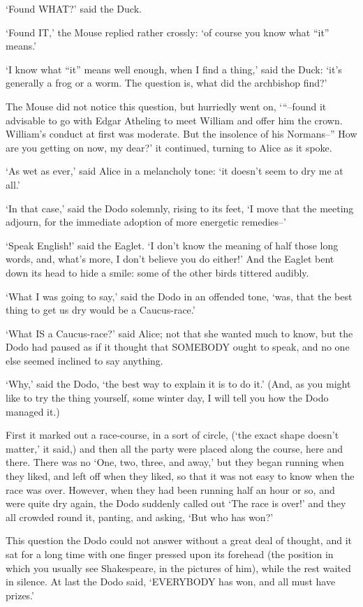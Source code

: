 \documentclass[12pt]{book}
\begin{document}
  `Found WHAT?' said the Duck.

  `Found IT,' the Mouse replied rather crossly:  `of course you
know what ``it'' means.'

  `I know what ``it'' means well enough, when I find a thing,' said
the Duck:  `it's generally a frog or a worm.  The question is,
what did the archbishop find?'

  The Mouse did not notice this question, but hurriedly went on,
`{}``--found it advisable to go with Edgar Atheling to meet William
and offer him the crown.  William's conduct at first was
moderate.  But the insolence of his Normans--''  How are you
getting on now, my dear?' it continued, turning to Alice as it
spoke.

  `As wet as ever,' said Alice in a melancholy tone:  `it doesn't
seem to dry me at all.'

  `In that case,' said the Dodo solemnly, rising to its feet, `I
move that the meeting adjourn, for the immediate adoption of more
energetic remedies--'

  `Speak English!' said the Eaglet.  `I don't know the meaning of
half those long words, and, what's more, I don't believe you do
either!'  And the Eaglet bent down its head to hide a smile:
some of the other birds tittered audibly.

  `What I was going to say,' said the Dodo in an offended tone,
`was, that the best thing to get us dry would be a Caucus-race.'

  `What IS a Caucus-race?' said Alice; not that she wanted much
to know, but the Dodo had paused as if it thought that SOMEBODY
ought to speak, and no one else seemed inclined to say anything.

  `Why,' said the Dodo, `the best way to explain it is to do it.'
(And, as you might like to try the thing yourself, some winter
day, I will tell you how the Dodo managed it.)

  First it marked out a race-course, in a sort of circle, (`the
exact shape doesn't matter,' it said,) and then all the party
were placed along the course, here and there.  There was no `One,
two, three, and away,' but they began running when they liked,
and left off when they liked, so that it was not easy to know
when the race was over.  However, when they had been running half
an hour or so, and were quite dry again, the Dodo suddenly called
out `The race is over!' and they all crowded round it, panting,
and asking, `But who has won?'

  This question the Dodo could not answer without a great deal of
thought, and it sat for a long time with one finger pressed upon
its forehead (the position in which you usually see Shakespeare,
in the pictures of him), while the rest waited in silence.  At
last the Dodo said, `EVERYBODY has won, and all must have
prizes.'
\end{document}

